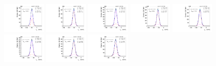 \begin{figure}[htb]
\includegraphics[width=0.19\textwidth]{plots/Appendix_Recoil_Fits/WmpMC_PF_13TeV_2G/pfu1fit_25.pdf}
\includegraphics[width=0.19\textwidth]{plots/Appendix_Recoil_Fits/WmpMC_PF_13TeV_2G/pfu1fit_26.pdf}
\includegraphics[width=0.19\textwidth]{plots/Appendix_Recoil_Fits/WmpMC_PF_13TeV_2G/pfu1fit_27.pdf}
\includegraphics[width=0.19\textwidth]{plots/Appendix_Recoil_Fits/WmpMC_PF_13TeV_2G/pfu1fit_28.pdf}
\includegraphics[width=0.19\textwidth]{plots/Appendix_Recoil_Fits/WmpMC_PF_13TeV_2G/pfu1fit_29.pdf}
\includegraphics[width=0.19\textwidth]{plots/Appendix_Recoil_Fits/WmpMC_PF_13TeV_2G/pfu1fit_30.pdf}
\includegraphics[width=0.19\textwidth]{plots/Appendix_Recoil_Fits/WmpMC_PF_13TeV_2G/pfu1fit_31.pdf}
\includegraphics[width=0.19\textwidth]{plots/Appendix_Recoil_Fits/WmpMC_PF_13TeV_2G/pfu1fit_32.pdf}

\end{figure}
